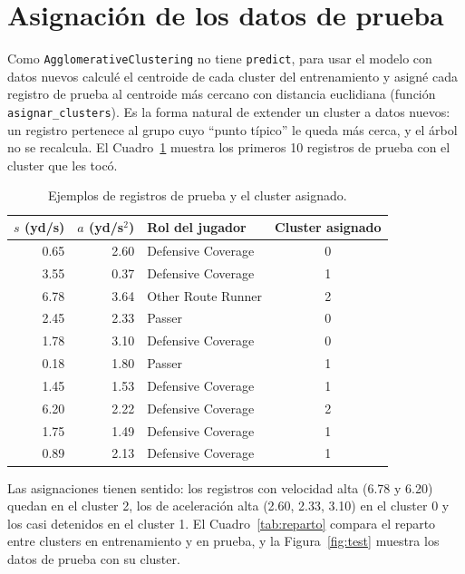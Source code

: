 \documentclass[11pt,a4paper]{article}
\begin{document}
\section{Asignación de los datos de prueba}
\label{sec:prueba}

Como \texttt{AgglomerativeClustering} no tiene \texttt{predict}, para usar el modelo con datos nuevos calculé el centroide de cada cluster del entrenamiento y asigné cada registro de prueba al centroide más cercano con distancia euclidiana (función \texttt{asignar\_clusters}). Es la forma natural de extender un cluster a datos nuevos: un registro pertenece al grupo cuyo ``punto típico'' le queda más cerca, y el árbol no se recalcula. El Cuadro~\ref{tab:ejemplos} muestra los primeros 10 registros de prueba con el cluster que les tocó.

\begin{table}[H]
  \centering
  \begin{tabular}{rrlc}
    \toprule
    $s$ (yd/s) & $a$ (yd/s$^2$) & Rol del jugador & Cluster asignado \\
    \midrule
    0.65 & 2.60 & Defensive Coverage & 0 \\
    3.55 & 0.37 & Defensive Coverage & 1 \\
    6.78 & 3.64 & Other Route Runner & 2 \\
    2.45 & 2.33 & Passer             & 0 \\
    1.78 & 3.10 & Defensive Coverage & 0 \\
    0.18 & 1.80 & Passer             & 1 \\
    1.45 & 1.53 & Defensive Coverage & 1 \\
    6.20 & 2.22 & Defensive Coverage & 2 \\
    1.75 & 1.49 & Defensive Coverage & 1 \\
    0.89 & 2.13 & Defensive Coverage & 1 \\
    \bottomrule
  \end{tabular}
  \caption{Ejemplos de registros de prueba y el cluster asignado.}
  \label{tab:ejemplos}
\end{table}

Las asignaciones tienen sentido: los registros con velocidad alta (6.78 y 6.20) quedan en el cluster 2, los de aceleración alta (2.60, 2.33, 3.10) en el cluster 0 y los casi detenidos en el cluster 1. El Cuadro~\ref{tab:reparto} compara el reparto entre clusters en entrenamiento y en prueba, y la Figura~\ref{fig:test} muestra los datos de prueba con su cluster.
\end{document}
